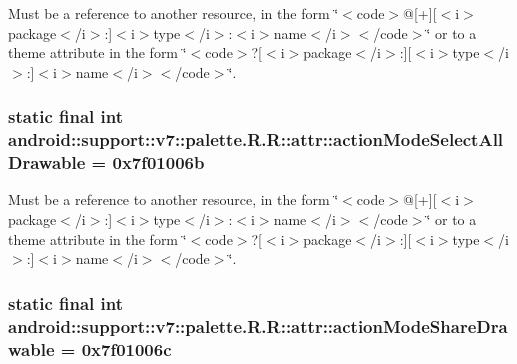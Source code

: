 Must be a reference to another resource, in the form \char`\"{}$<$code$>$@\mbox{[}+\mbox{]}\mbox{[}$<$i$>$package$<$/i$>$:\mbox{]}$<$i$>$type$<$/i$>$:$<$i$>$name$<$/i$>$$<$/code$>$\char`\"{} or to a theme attribute in the form \char`\"{}$<$code$>$?\mbox{[}$<$i$>$package$<$/i$>$:\mbox{]}\mbox{[}$<$i$>$type$<$/i$>$:\mbox{]}$<$i$>$name$<$/i$>$$<$/code$>$\char`\"{}. \hypertarget{classandroid_1_1support_1_1v7_1_1palette_1_1_r_1_1attr_e34a95050dd897837b91bded8389bef1}{
\subsubsection[{actionModeSelectAllDrawable}]{\setlength{\rightskip}{0pt plus 5cm}static final int android::support::v7::palette.R.R::attr::actionModeSelectAllDrawable = 0x7f01006b}}
\label{classandroid_1_1support_1_1v7_1_1palette_1_1_r_1_1attr_e34a95050dd897837b91bded8389bef1}


Must be a reference to another resource, in the form \char`\"{}$<$code$>$@\mbox{[}+\mbox{]}\mbox{[}$<$i$>$package$<$/i$>$:\mbox{]}$<$i$>$type$<$/i$>$:$<$i$>$name$<$/i$>$$<$/code$>$\char`\"{} or to a theme attribute in the form \char`\"{}$<$code$>$?\mbox{[}$<$i$>$package$<$/i$>$:\mbox{]}\mbox{[}$<$i$>$type$<$/i$>$:\mbox{]}$<$i$>$name$<$/i$>$$<$/code$>$\char`\"{}. \hypertarget{classandroid_1_1support_1_1v7_1_1palette_1_1_r_1_1attr_9bc1d10fc05eef06042c3ec5402e08e2}{
\subsubsection[{actionModeShareDrawable}]{\setlength{\rightskip}{0pt plus 5cm}static final int android::support::v7::palette.R.R::attr::actionModeShareDrawable = 0x7f01006c}}
\label{classandroid_1_1support_1_1v7_1_1palette_1_1_r_1_1attr_9bc1d10fc05eef06042c3ec5402e08e2}


